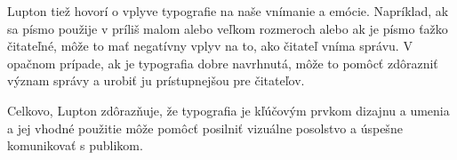 \documentclass[a4paper, 11pt]{article}
\begin{document}
Lupton tiež hovorí o vplyve typografie na naše vnímanie a emócie. Napríklad, ak sa písmo použije v príliš malom alebo veľkom rozmeroch alebo ak je písmo ťažko čitateľné, môže to mať negatívny vplyv na to, ako čitateľ vníma správu. V opačnom prípade, ak je typografia dobre navrhnutá, môže to pomôcť zdôrazniť význam správy a urobiť ju prístupnejšou pre čitateľov.

Celkovo, Lupton zdôrazňuje, že typografia je kľúčovým prvkom dizajnu a umenia a jej vhodné použitie môže pomôcť posilniť vizuálne posolstvo a úspešne komunikovať s publikom. \cite{LUPTON}







\newpage

\renewcommand{\refname}{Literatúra}

\end{document}
